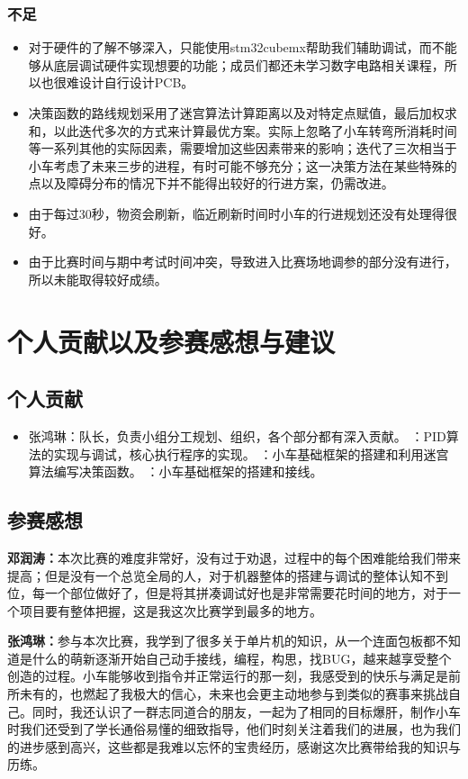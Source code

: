 \documentclass[UTF8]{ctexart}
\begin{document}
\subsubsection{不足}

\begin{itemize}
\item 对于硬件的了解不够深入，只能使用stm32cubemx帮助我们辅助调试，而不能够从底层调试硬件实现想要的功能；成员们都还未学习数字电路相关课程，所以也很难设计自行设计PCB。
\item 决策函数的路线规划采用了迷宫算法计算距离以及对特定点赋值，最后加权求和，以此迭代多次的方式来计算最优方案。实际上忽略了小车转弯所消耗时间等一系列其他的实际因素，需要增加这些因素带来的影响；迭代了三次相当于小车考虑了未来三步的进程，有时可能不够充分；这一决策方法在某些特殊的点以及障碍分布的情况下并不能得出较好的行进方案，仍需改进。
\item 由于每过30秒，物资会刷新，临近刷新时间时小车的行进规划还没有处理得很好。
\item 由于比赛时间与期中考试时间冲突，导致进入比赛场地调参的部分没有进行，所以未能取得较好成绩。
\end{itemize}

\section{个人贡献以及参赛感想与建议}
\subsection{个人贡献}
\begin{itemize}
\item 张鸿琳：队长，负责小组分工规划、组织，各个部分都有深入贡献。
：PID算法的实现与调试，核心执行程序的实现。
：小车基础框架的搭建和利用迷宫算法编写决策函数。
：小车基础框架的搭建和接线。
\end{itemize}
\subsection{参赛感想}

\textbf{邓润涛：}本次比赛的难度非常好，没有过于劝退，过程中的每个困难能给我们带来提高；但是没有一个总览全局的人，对于机器整体的搭建与调试的整体认知不到位，每一个部位做好了，但是将其拼凑调试好也是非常需要花时间的地方，对于一个项目要有整体把握，这是我这次比赛学到最多的地方。

\textbf{张鸿琳：}参与本次比赛，我学到了很多关于单片机的知识，从一个连面包板都不知道是什么的萌新逐渐开始自己动手接线，编程，构思，找BUG，越来越享受整个创造的过程。小车能够收到指令并正常运行的那一刻，我感受到的快乐与满足是前所未有的，也燃起了我极大的信心，未来也会更主动地参与到类似的赛事来挑战自己。同时，我还认识了一群志同道合的朋友，一起为了相同的目标爆肝，制作小车时我们还受到了学长通俗易懂的细致指导，他们时刻关注着我们的进展，也为我们的进步感到高兴，这些都是我难以忘怀的宝贵经历，感谢这次比赛带给我的知识与历练。
\end{document}
